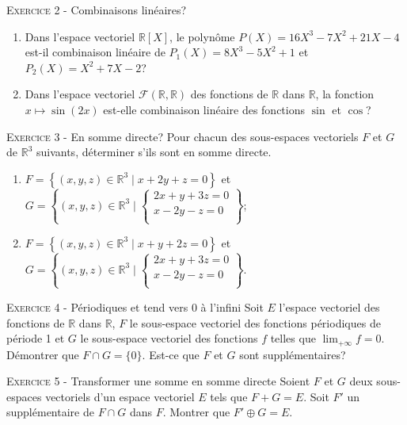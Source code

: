 

\vskip0.3cm\noindent\textsc{Exercice 2} - Combinaisons linéaires?
\vskip0.2cm
\begin{enumerate}
\item Dans l'espace vectoriel $\mathbb R[X]$, le polynôme $P(X)=16X^3-7X^2+21X-4$ est-il combinaison linéaire de $P_1(X)=8X^3-5X^2+1$ et $P_2(X)=X^2+7X-2$?
\item Dans l'espace vectoriel $\mathcal F(\mathbb R,\mathbb R)$ des fonctions de $\mathbb R$ dans $\mathbb R$, la fonction $x\mapsto \sin(2x)$ est-elle combinaison linéaire des fonctions $\sin$ et $\cos$?
\end{enumerate}




\vskip0.3cm\noindent\textsc{Exercice 3} - En somme directe?
\vskip0.2cm
Pour chacun des sous-espaces vectoriels $F$ et $G$ de $\mathbb R^3$ suivants, déterminer s'ils sont en somme directe.
\begin{enumerate}
\item $F=\left\{(x,y,z)\in \mathbb R^3\mid x+2y+z=0\right\}$ et $G=\left\{(x,y,z)\in \mathbb R^3\mid \left\{\begin{array}{l}
2x + y + 3z = 0 \\
x - 2y - z = 0 \\
\end{array}\right.\right\}$; 
\item $F=\left\{(x,y,z)\in \mathbb R^3\mid x+y+2z=0\right\}$ et $G=\left\{(x,y,z)\in \mathbb R^3\mid \left\{\begin{array}{l}
2x + y + 3z = 0 \\
x - 2y - z = 0 \\
\end{array}\right.\right\}$.
\end{enumerate}




\vskip0.3cm\noindent\textsc{Exercice 4} - Périodiques et tend vers 0 à l'infini
\vskip0.2cm
Soit $E$ l'espace vectoriel des fonctions de $\mathbb R$ dans $\mathbb R$, $F$ le sous-espace vectoriel des fonctions périodiques de période 1 et $G$ le sous-espace vectoriel des fonctions $f$ telles que $\lim_{+\infty}f=0$. Démontrer que $F\cap G=\{0\}$. Est-ce que $F$ et $G$ sont supplémentaires?




\vskip0.3cm\noindent\textsc{Exercice 5} - Transformer une somme en somme directe
\vskip0.2cm
Soient $F$ et $G$ deux sous-espaces vectoriels d'un espace vectoriel $E$ tels que
$F+G=E$. Soit $F'$ un supplémentaire de $F\cap G$ dans $F$. Montrer que
$F'\oplus G=E$.


